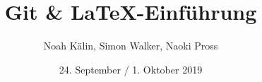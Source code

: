\documentclass{beamer}
\title{Git \& \textrm{\LaTeX}-Einführung}
\author{
    Noah Kälin\inst{1},
    Simon Walker\inst{1},
	Naoki Pross\inst{1}
}
\institute[HSR]{\inst{1}Hochschule f\"ur Technick Rapperswil}
\date{24. September / 1. Oktober 2019}
\begin{document}
\frame{\titlepage}



\end{document}
